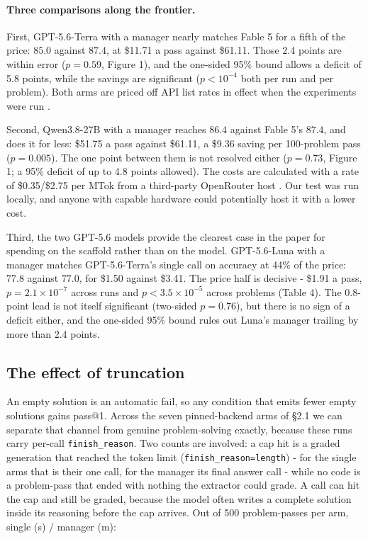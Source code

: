 \documentclass[11pt]{article}
\begin{document}
\paragraph{Three comparisons along the frontier.}
First, GPT-5.6-Terra with a manager nearly matches Fable 5 for a fifth
of the price: $85.0$ against $87.4$, at \$11.71 a pass against \$61.11. Those 2.4 points
are within error ($p = 0.59$, Figure 1), and the one-sided 95\% bound allows a
deficit of 5.8 points, while the savings are significant ($p < 10^{-4}$ both per run and per problem).
Both arms are priced off API list rates in effect when the experiments were run
\cite{openai2026price,anthropic2026price}.

Second, Qwen3.8-27B with a manager reaches $86.4$ against Fable 5's $87.4$, and
does it for less: \$51.75 a pass against \$61.11, a \$9.36 saving per 100-problem pass
($p = 0.005$). The one point between them is not resolved either ($p = 0.73$, Figure 1; a
95\% deficit of up to 4.8 points allowed). The costs are calculated with a rate of \$0.35/\$2.75 per MTok from a third-party OpenRouter host \cite{openrouter2026}. Our test was run locally, and anyone with capable hardware could potentially host it with a lower cost.

Third, the two GPT-5.6 models provide the clearest case in the paper for
spending on the scaffold rather than on the model. GPT-5.6-Luna with a manager
matches GPT-5.6-Terra's single call on accuracy at 44\% of the price: $77.8$ against
$77.0$, for \$1.50 against \$3.41. The price half is decisive - \$1.91 a pass,
$p = 2.1\times10^{-7}$ across runs and $p < 3.5\times10^{-5}$ across problems (Table 4). The 0.8-point lead is not
itself significant (two-sided $p = 0.76$), but there is no sign of a deficit either, and the one-sided 95\% bound rules out Luna's manager trailing by
more than 2.4 points.

\FloatBarrier

\subsection{The effect of truncation}

An empty solution is an automatic fail, so any condition that emits fewer empty solutions
gains pass@1. Across the seven pinned-backend arms of \S2.1 we can separate that channel from
genuine problem-solving exactly, because these runs carry per-call
\texttt{finish\_reason}. Two counts are involved:
a cap hit is a graded generation that reached the token limit
(\texttt{finish\_reason=length}) - for the single arms that is their one call, for the
manager its final answer call - while no code is a problem-pass that ended with
nothing the extractor could grade. A call can hit the cap and still be graded, because the
model often writes a complete solution inside its reasoning before the cap arrives.
Out of 500 problem-passes per arm, single (s) / manager (m):
\end{document}

